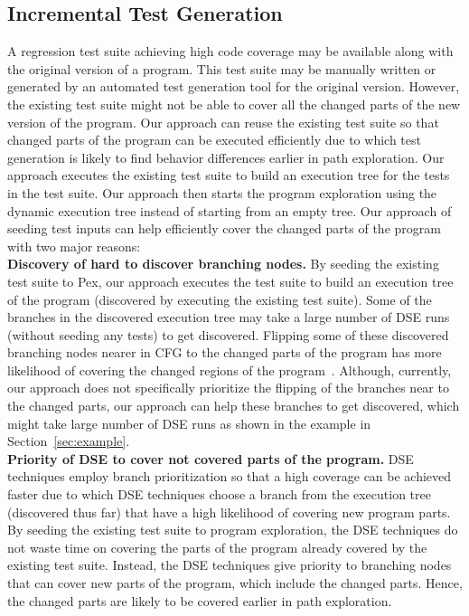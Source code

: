 \subsection{Incremental Test Generation}
\label{sec:incremental}
A regression test suite achieving high code coverage may be available along with the original version of  a program. This test suite may be manually written or generated by an automated test generation tool for the original version. However, the existing test suite might not be able to cover all the changed parts of the new version of the program. Our approach can reuse the existing test suite so that changed parts of the program can be executed efficiently due to which test generation is likely to find behavior differences earlier in path exploration. Our approach executes the existing test suite to build an execution
tree for the tests in the test suite. Our approach then starts the program
exploration using the dynamic execution tree instead of starting from an empty
tree. Our approach of seeding test inputs can help efficiently cover the changed parts of the program with two major reasons:
\\ \textbf{Discovery of hard to discover branching nodes.} By seeding the existing test suite to Pex, our approach executes the test suite to build an execution tree of the program (discovered by executing the existing test suite). Some of the branches in the discovered execution tree may take a large number of DSE runs (without seeding any tests) to get discovered. Flipping some of these discovered branching nodes nearer in CFG to the changed parts of the
program has more likelihood of covering the changed regions of the program~\cite{burnim}. Although, currently, our approach does not specifically prioritize the flipping of the branches near to the changed parts, our approach can help these branches to get discovered, which might take large number of DSE runs as shown in the example in Section~\ref{sec:example}.
\\ \textbf{Priority of DSE to cover not covered parts of the program.} DSE techniques employ branch prioritization so that a high coverage can be achieved faster due to which DSE techniques choose a branch from the execution tree (discovered thus far) that have a high likelihood of covering new program parts. By seeding the existing test suite to program exploration, the DSE techniques do not waste time on covering the parts of the program already covered by the existing test suite. Instead, the DSE techniques give priority to branching nodes that can cover new parts of the program, which include the changed parts. Hence, the changed parts are likely to be covered earlier in path exploration.
 
